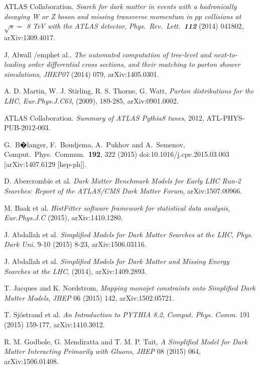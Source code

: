 ATLAS Collaboration. \emph{Search for dark matter in events with a hadronically decaying W or Z boson and missing transverse momentum in $pp$ collisions at $\sqrt{s} =$ 8 TeV with the ATLAS detector}, \emph{Phys.\ Rev.\ Lett.\  {\bf 112}} (2014) 041802, arXiv:1309.4017.

J. Alwall /emph{et al.}. \emph{The automated computation of tree-level and next-to-leading order differential cross sections, and their matching to parton shower simulations}, \emph{JHEP07} (2014) 079, arXiv:1405.0301.

A. D. Martin, W. J. Stirling, R. S. Thorne, G. Watt, \emph{Parton distributions for the LHC}, \emph{Eur.Phys.J.C63}, (2009), 189-285, arXiv:0901.0002.

ATLAS Collaboration. \emph{Summary of ATLAS Pythia8 tunes}, 2012, ATL-PHYS-PUB-2012-003.

  G.~B�langer, F.~Boudjema, A.~Pukhov and A.~Semenov,
  Comput.\ Phys.\ Commun.\  {\bf 192}, 322 (2015)
  doi:10.1016/j.cpc.2015.03.003
  [arXiv:1407.6129 [hep-ph]].

D. Abercrombie et al. \emph{Dark Matter Benchmark Models for Early LHC Run-2 Searches: Report of the ATLAS/CMS Dark Matter Forum}, arXiv:1507.00966.

M. Baak et al. \emph{HistFitter software framework for statistical data analysis}, \emph{Eur.Phys.J.C} (2015), arXiv:1410.1280.

J. Abdallah et al. \emph{Simplified Models for Dark Matter Searches at the LHC}, \emph{Phys. Dark Uni.} 9-10 (2015) 8-23, arXiv:1506.03116.

J. Abdallah et al. \emph{Simplified Models for Dark Matter and Missing Energy Searches at the LHC}, (2014), arXiv:1409.2893.

T. Jacques and K. Nordstrom, \emph{Mapping monojet constraints onto Simplified Dark Matter Models}, \emph{JHEP} 06 (2015) 142, arXiv:1502.05721.

T. Sjöstrand et al. \emph{An Introduction to PYTHIA 8.2}, \emph{Comput. Phys. Comm.} 191 (2015) 159-177, arXiv:1410.3012.

R. M. Godbole, G. Mendiratta and T. M. P. Tait, \emph{A Simplified Model for Dark Matter Interacting Primarily with Gluons}, \emph{JHEP} 08 (2015) 064, arXiv:1506.01408.

